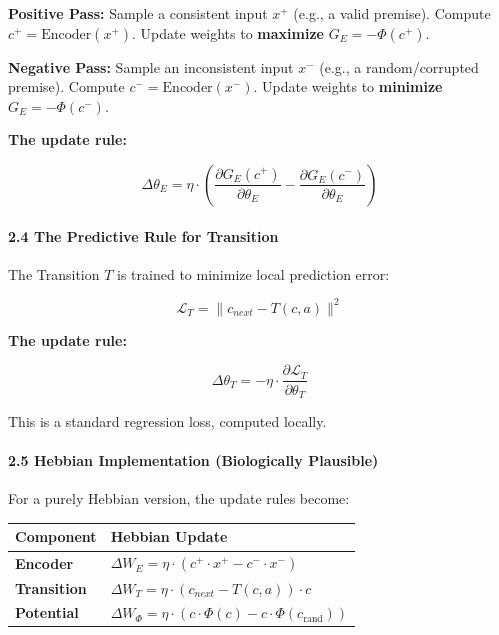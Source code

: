 \documentclass[
  11pt,
  a4paper,
]{article}
\begin{document}
\textbf{Positive Pass:} Sample a consistent input \(x^+\) (e.g., a valid
premise). Compute \(c^+ = \text{Encoder}(x^+)\). Update weights to
\textbf{maximize} \(G_E = -\Phi(c^+)\).

\textbf{Negative Pass:} Sample an inconsistent input \(x^-\) (e.g., a
random/corrupted premise). Compute \(c^- = \text{Encoder}(x^-)\). Update
weights to \textbf{minimize} \(G_E = -\Phi(c^-)\).

\textbf{The update rule:}

\[\Delta \theta_E = \eta \cdot \left( \frac{\partial G_E(c^+)}{\partial \theta_E} - \frac{\partial G_E(c^-)}{\partial \theta_E} \right)\]

\paragraph{2.4 The Predictive Rule for
Transition}\label{the-predictive-rule-for-transition}

The Transition \(T\) is trained to minimize local prediction error:

\[\mathcal{L}_T = \|c_{next} - T(c, a)\|^2\]

\textbf{The update rule:}

\[\Delta \theta_T = -\eta \cdot \frac{\partial \mathcal{L}_T}{\partial \theta_T}\]

This is a standard regression loss, computed locally.

\paragraph{2.5 Hebbian Implementation (Biologically
Plausible)}\label{hebbian-implementation-biologically-plausible}

For a purely Hebbian version, the update rules become:

\begin{longtable}[]{@{}
  >{\raggedright\arraybackslash}p{}
  >{\raggedright\arraybackslash}p{}@{}}
\toprule\noalign{}
\begin{minipage}[b]{\linewidth}\raggedright
Component
\end{minipage} & \begin{minipage}[b]{\linewidth}\raggedright
Hebbian Update
\end{minipage} \\
\midrule\noalign{}
\endhead
\bottomrule\noalign{}
\endlastfoot
\textbf{Encoder} &
\(\Delta W_E = \eta \cdot (c^+ \cdot x^+ - c^- \cdot x^-)\) \\
\textbf{Transition} &
\(\Delta W_T = \eta \cdot (c_{next} - T(c,a)) \cdot c\) \\
\textbf{Potential} &
\(\Delta W_\Phi = \eta \cdot (c \cdot \Phi(c) - c \cdot \Phi(c_{\text{rand}}))\) \\
\end{longtable}
\end{document}
